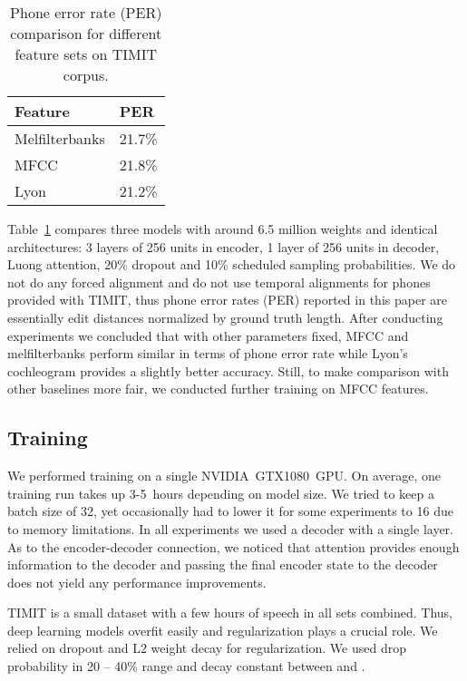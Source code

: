 \documentclass[a4paper]{article}
\begin{document}
\begin{table}[th]
  \caption{Phone error rate (PER) comparison for different feature sets on TIMIT corpus.}
  \label{tab:FeaturesTimit}
\centering
  \begin{tabular}{ll}
    \toprule
    \textbf{Feature} & \textbf{PER} \\
    \midrule
    Melfilterbanks & 21.7\% \\
    MFCC & 21.8\% \\
    Lyon & 21.2\% \\
    \bottomrule
  \end{tabular}
\end{table}

Table~\ref{tab:FeaturesTimit} compares three models with around 6.5 million weights and identical architectures: 3 layers of 256 units in encoder, 1 layer of 256 units in decoder, Luong attention, 20\% dropout and 10\% scheduled sampling probabilities. We do not do any forced alignment and do not use temporal alignments for phones provided with TIMIT, thus phone error rates (PER) reported in this paper are essentially edit distances normalized by ground truth length. After conducting experiments we concluded that with other parameters fixed, MFCC and melfilterbanks perform similar in terms of phone error rate while Lyon's cochleogram provides a slightly better accuracy. Still, to make comparison with other baselines more fair, we conducted further training on MFCC features.

\subsection{Training}
We performed training on a single NVIDIA~GTX1080~GPU. On average, one training run takes up 3-5~hours depending on model size. We tried to keep a batch size of 32, yet occasionally had to lower it for some experiments to 16 due to memory limitations. In all experiments we used a decoder with a single layer. As to the encoder-decoder connection, we noticed that attention provides enough information to the decoder and passing the final encoder state to the decoder does not yield any performance improvements.

TIMIT is a small dataset with a few hours of speech in all sets combined. Thus, deep learning models overfit easily and regularization plays a crucial role. We relied on dropout and L2 weight decay for regularization. We used drop probability in 20 -- 40\% range and decay constant between  and .
\end{document}

